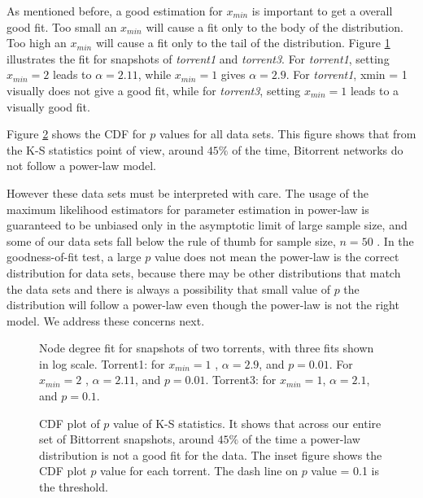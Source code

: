 \documentclass[paper]{ieice}
\begin{document}
As mentioned before, a good estimation for $x_{min}$ is important to get a overall good fit.
Too small an $x_{min}$ will cause a fit only to the body of the distribution.
Too high an $x_{min}$ will cause a fit only to the tail of the distribution.
Figure  \ref{fig:fitting} illustrates the fit for snapshots of \emph{torrent1} and \emph{torrent3}.
For \emph{torrent1}, setting $x_{min}=2$  leads to  $\alpha=2.11$, while $x_{min}=1$ gives $\alpha=2.9$.
For \emph{torrent1}, xmin = 1 visually does not give a good fit, while for  \emph{torrent3}, setting $x_{min}=1$ leads to a visually good fit.

Figure  \ref{fig:cdf-p} shows the CDF for $p$ values for all data sets. 
This figure shows that from the K-S statistics point of view, around $45\%$ of the time, Bitorrent networks do not follow a power-law model.

However these data sets must be interpreted with care. 
The usage of the maximum likelihood estimators for parameter estimation in power-law is guaranteed to be unbiased only in the asymptotic limit of large sample size, and some of our data sets fall below the rule of thumb for sample size, $n=50$ \cite{clauset2009power}. 
In the goodness-of-fit test, a large $p$ value does not mean the power-law  is the correct distribution for data sets, because there may be other distributions that match the data sets and there is always a possibility that small value of $p$ the distribution will follow a power-law even though the power-law is not the right model\cite{clauset2009power}. 
We address these concerns next.

\begin{figure}
\centering
{}
\caption{Node degree fit for snapshots of two torrents, with three fits shown in log scale. Torrent1: for $x_{min}=1$ , $\alpha = 2.9$, and $p=0.01$. For $x_{min}=2$ , $\alpha = 2.11$, and $p = 0.01$. Torrent3: for $x_{min}=1$, $\alpha = 2.1$, and $p = 0.1$. }
\label{fig:fitting}
\vspace{-2mm}
\end{figure}

\begin{figure}
\centering
\caption{CDF plot of $p$ value of K-S statistics. It shows that across our entire set of Bittorrent snapshots, around $45\%$ of the time a power-law distribution is not a good fit for the data. 
The inset figure shows the CDF plot $p$ value for each torrent. The dash line on $p$ value = 0.1 is the threshold.} 
\label{fig:cdf-p}
\vspace{-2mm}
\end{figure}
\end{document}
